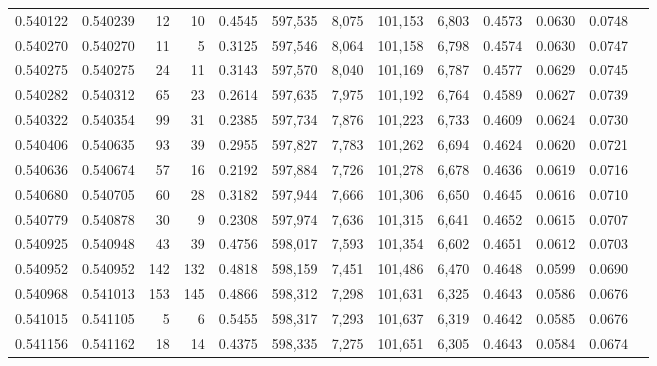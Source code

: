\begin{tabular}{rrrrrrrrrrrrr}
0.540122 & 0.540239 &    12 &    10 &                                     0.4545 & 597,535 &   8,075 & 101,153 &   6,803 & 0.4573 & 0.0630 & 0.0748 \\
0.540270 & 0.540270 &    11 &     5 &                                     0.3125 & 597,546 &   8,064 & 101,158 &   6,798 & 0.4574 & 0.0630 & 0.0747 \\
0.540275 & 0.540275 &    24 &    11 &                                     0.3143 & 597,570 &   8,040 & 101,169 &   6,787 & 0.4577 & 0.0629 & 0.0745 \\
0.540282 & 0.540312 &    65 &    23 &                                     0.2614 & 597,635 &   7,975 & 101,192 &   6,764 & 0.4589 & 0.0627 & 0.0739 \\
0.540322 & 0.540354 &    99 &    31 &                                     0.2385 & 597,734 &   7,876 & 101,223 &   6,733 & 0.4609 & 0.0624 & 0.0730 \\
0.540406 & 0.540635 &    93 &    39 &                                     0.2955 & 597,827 &   7,783 & 101,262 &   6,694 & 0.4624 & 0.0620 & 0.0721 \\
0.540636 & 0.540674 &    57 &    16 &                                     0.2192 & 597,884 &   7,726 & 101,278 &   6,678 & 0.4636 & 0.0619 & 0.0716 \\
0.540680 & 0.540705 &    60 &    28 &                                     0.3182 & 597,944 &   7,666 & 101,306 &   6,650 & 0.4645 & 0.0616 & 0.0710 \\
0.540779 & 0.540878 &    30 &     9 &                                     0.2308 & 597,974 &   7,636 & 101,315 &   6,641 & 0.4652 & 0.0615 & 0.0707 \\
0.540925 & 0.540948 &    43 &    39 &                                     0.4756 & 598,017 &   7,593 & 101,354 &   6,602 & 0.4651 & 0.0612 & 0.0703 \\
0.540952 & 0.540952 &   142 &   132 &                                     0.4818 & 598,159 &   7,451 & 101,486 &   6,470 & 0.4648 & 0.0599 & 0.0690 \\
0.540968 & 0.541013 &   153 &   145 &                                     0.4866 & 598,312 &   7,298 & 101,631 &   6,325 & 0.4643 & 0.0586 & 0.0676 \\
0.541015 & 0.541105 &     5 &     6 &                                     0.5455 & 598,317 &   7,293 & 101,637 &   6,319 & 0.4642 & 0.0585 & 0.0676 \\
0.541156 & 0.541162 &    18 &    14 &                                     0.4375 & 598,335 &   7,275 & 101,651 &   6,305 & 0.4643 & 0.0584 & 0.0674 \\

\end{tabular}
